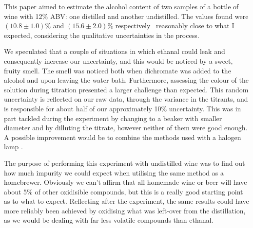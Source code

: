 This paper aimed to estimate the alcohol content of two samples of a bottle of wine with 12\% ABV: one distilled and another undistilled. The values found were $(10.8 \pm 1.0)\%$ and $(15.6\pm 2.0)\%$ respectively \textendash\ reasonably close to what I expected, considering the qualitative uncertainties in the process.

We speculated that a couple of situations in which ethanal could leak and consequently increase our uncertainty, and this would be noticed by a sweet, fruity smell. The smell was noticed both when dichromate was added to the alcohol and upon leaving the water bath. Furthermore, assessing the colour of the solution during titration presented a larger challenge than expected. This random uncertainty is reflected on our raw data, through the variance in the titrants, and is responsible for about half of our approximately 10\% uncertainty. This was in part tackled during the experiment by changing to a beaker with smaller diameter and by dilluting the titrate, however neither of them were good enough. A possible improvement would be to combine the methods used with a halogen lamp \citep{FergSirromet}.

The purpose of performing this experiment with undistilled wine was to find out how much impurity we could expect when utilising the same method as a homebrewer. Obviously we can't affirm that all homemade wine or beer will have about 5\% of other oxidisible compounds, but this is a really good starting point as to what to expect. Reflecting after the experiment, the same results could have more reliably been achieved by oxidising what was left-over from the distillation, as we would be dealing with far less volatile compounds than ethanal.